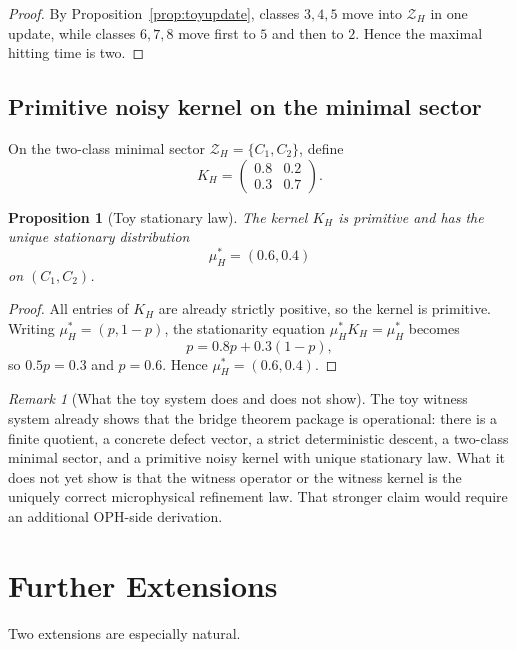 \documentclass[11pt]{article}
\newtheorem{proposition}[theorem]{Proposition}
\theoremstyle{remark}
\newtheorem{remark}[theorem]{Remark}
\theoremstyle{plain}
\begin{document}
\begin{proof}
By Proposition~\ref{prop:toyupdate}, classes \(3,4,5\) move into \(\mathcal Z_H\) in one update, while classes \(6,7,8\) move first to \(5\) and then to \(2\). Hence the maximal hitting time is two.
\end{proof}

\subsection{Primitive noisy kernel on the minimal sector}

On the two-class minimal sector \(\mathcal Z_H=\{C_1,C_2\}\), define
\[
K_H=
\begin{pmatrix}
0.8 & 0.2\\
0.3 & 0.7
\end{pmatrix}.
\]

\begin{proposition}[Toy stationary law]
\label{prop:toystationary}
The kernel \(K_H\) is primitive and has the unique stationary distribution
\[
\mu_H^\ast=(0.6,0.4)
\]
on \((C_1,C_2)\).
\end{proposition}

\begin{proof}
All entries of \(K_H\) are already strictly positive, so the kernel is primitive. Writing \(\mu_H^\ast=(p,1-p)\), the stationarity equation \(\mu_H^\ast K_H=\mu_H^\ast\) becomes
\[
p=0.8p+0.3(1-p),
\]
so \(0.5p=0.3\) and \(p=0.6\). Hence \(\mu_H^\ast=(0.6,0.4)\).
\end{proof}

\begin{remark}[What the toy system does and does not show]
The toy witness system already shows that the bridge theorem package is operational: there is a finite quotient, a concrete defect vector, a strict deterministic descent, a two-class minimal sector, and a primitive noisy kernel with unique stationary law. What it does not yet show is that the witness operator or the witness kernel is the uniquely correct microphysical refinement law. That stronger claim would require an additional OPH-side derivation.
\end{remark}

\section{Further Extensions}
\label{sec:extensions}

Two extensions are especially natural.
\end{document}
